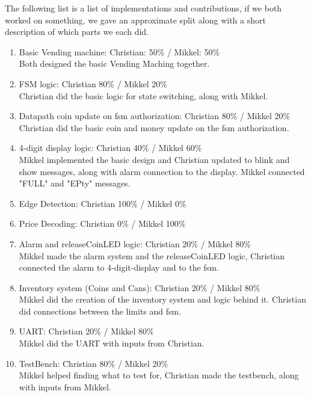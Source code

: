 The following list is a list of implementations and contributions, if we both worked on something, we gave an approximate split along with a short description of which parts we each did.
\begin{enumerate}
    \item Basic Vending machine: Christian: 50\% / Mikkel: 50\% \\
    Both designed the basic Vending Maching together.
    \item FSM logic: Christian 80\% / Mikkel 20\% \\
    Christian did the basic logic for state switching, along with Mikkel.
    \item Datapath coin update on fsm authorization: Christian 80\% / Mikkel 20\%\\
    Christian did the basic coin and money update on the fsm authorization.
    \item 4-digit display logic: Christian 40\% / Mikkel 60\%\\
    Mikkel implemented the basic design and Christian updated to blink and show messages, along with alarm connection to the display. Mikkel connected "FULL" and "EPty" messages.
    \item Edge Detection: Christian 100\% / Mikkel 0\%
    \item Price Decoding: Christian 0\% / Mikkel 100\%
    \item Alarm and releaseCoinLED logic: Christian 20\% / Mikkel 80\%\\
    Mikkel made the alarm system and the releaseCoinLED logic, Christian connected the alarm to 4-digit-display and to the fsm.
    \item Inventory system (Coins and Cans): Christian 20\% / Mikkel 80\%\\
    Mikkel did the creation of the inventory system and logic behind it. Christian did connections between the limits and fsm.
    \item UART: Christian 20\% / Mikkel 80\%\\
    Mikkel did the UART with inputs from Christian.
    \item TestBench: Christian 80\% / Mikkel 20\%\\
    Mikkel helped finding what to test for, Christian made the testbench, along with inputs from Mikkel.
\end{enumerate}